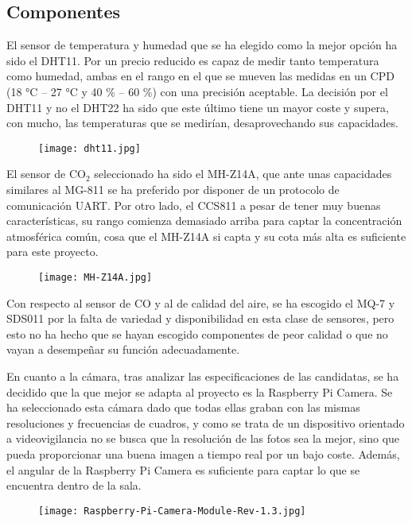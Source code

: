 \subsection{Componentes}\label{subsec:componentes}
El sensor de temperatura y humedad que se ha elegido como la mejor opción ha sido el DHT11. Por un precio reducido es capaz de medir tanto temperatura como humedad, ambas en el rango en el que se mueven las medidas en un CPD (18 °C -- 27 °C y  40 \% -- 60 \%) con una precisión aceptable. La decisión por el DHT11 y no el DHT22 ha sido que este último tiene un mayor coste y supera, con mucho, las temperaturas que se medirían, desaprovechando sus capacidades.
\begin{figure}[H]
	{\texttt{[image: dht11.jpg]}}\label{fig:dht11}
\end{figure}
El sensor de CO$_2$ seleccionado ha sido el MH-Z14A, que ante unas capacidades similares al MG-811 se ha preferido por disponer de un protocolo de comunicación UART. Por otro lado, el CCS811 a pesar de tener muy buenas características, su rango comienza demasiado arriba para captar la concentración atmosférica común, cosa que el MH-Z14A si capta y su cota más alta es suficiente para este proyecto.
\begin{figure}[H]
	{\texttt{[image: MH-Z14A.jpg]}}\label{fig:mh-z14a}
\end{figure}
Con respecto al sensor de CO y al de calidad del aire, se ha escogido el MQ-7 y SDS011 por la falta de variedad y disponibilidad en esta clase de sensores, pero esto no ha hecho que se hayan escogido componentes de peor calidad o que no vayan a desempeñar su función adecuadamente.

En cuanto a la cámara, tras analizar las especificaciones de las candidatas, se ha decidido que la que mejor se adapta al proyecto es la Raspberry Pi Camera. Se ha seleccionado esta cámara dado que todas ellas graban con las mismas resoluciones y frecuencias de cuadros, y como se trata de un dispositivo orientado a videovigilancia no se busca que la resolución de las fotos sea la mejor, sino que pueda proporcionar una buena imagen a tiempo real por un bajo coste. Además, el angular de la Raspberry Pi Camera es suficiente para captar lo que se encuentra dentro de la sala.
\begin{figure}[H]
	{\texttt{[image: Raspberry-Pi-Camera-Module-Rev-1.3.jpg]}}\label{fig:moduloCamara}
\end{figure}
\pagebreak
